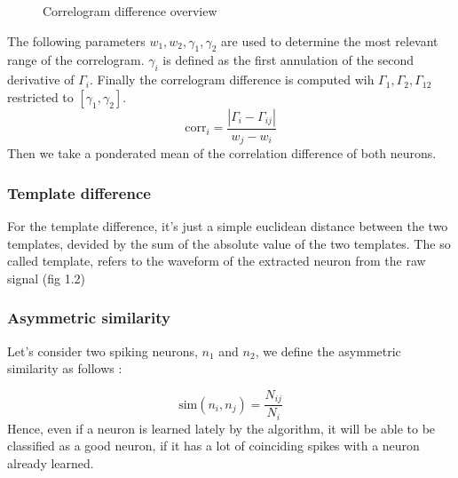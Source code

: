 \documentclass[11pt,a4paper]{report}
\begin{document}
\begin{multicols}{2}
\begin{figure}[H]
        \caption{Correlogram difference overview}
        \label{fig:corr}
    \end{figure}

    The following parameters $w_1, w_2, \gamma_1, \gamma_2$ are used to determine the most relevant range of the correlogram.
    $\gamma_i$ is defined as the first annulation of the second derivative of $\Gamma_i$. Finally the correlogram difference is computed wih $\Gamma_1, \Gamma_2, \Gamma_{12}$ restricted to $[\gamma_1, \gamma_2]$.
    $$\text{corr}_i = \frac{|\Gamma_i - \Gamma_{ij}|}{w_j - w_i}$$
    Then we take a ponderated mean of the correlation difference of both neurons.
    \subsubsection{Template difference} For the template difference, it's just a simple euclidean distance between the two templates, devided by the sum of the absolute value of the two templates. The so called template, refers to the waveform of the extracted neuron from the raw signal (fig 1.2)

    \subsubsection{Asymmetric similarity}

    Let's consider two spiking neurons, $n_1$ and $n_2$, we define the asymmetric similarity as follows :

    $$\text{sim}(n_i, n_j) = \frac{N_{ij}}{N_i}$$
    Hence, even if a neuron is learned lately by the algorithm, it will be able to be classified as a good neuron, if it has a lot of coinciding spikes with a neuron already learned.

\end{multicols}
\end{document}
